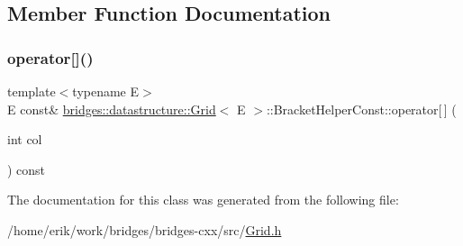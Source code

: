 \subsection{Member Function Documentation}
\mbox{\label{classbridges_1_1datastructure_1_1_grid_1_1_bracket_helper_const_a3a0571d419200f98e525441e16bb707c}} 
\subsubsection{\texorpdfstring{operator[]()}{operator[]()}}
{\footnotesize\ttfamily template$<$typename E$>$ \\
E const\& \hyperlink{classbridges_1_1datastructure_1_1_grid}{bridges\+::datastructure\+::\+Grid}$<$ E $>$\+::Bracket\+Helper\+Const\+::operator\mbox{[}$\,$\mbox{]} (\begin{DoxyParamCaption}\item[{int}]{col }\end{DoxyParamCaption}) const\hspace{0.3cm}{\ttfamily [inline]}}



The documentation for this class was generated from the following file\+:\begin{DoxyCompactItemize}
\item 
/home/erik/work/bridges/bridges-\/cxx/src/\hyperlink{_grid_8h}{Grid.\+h}\end{DoxyCompactItemize}
